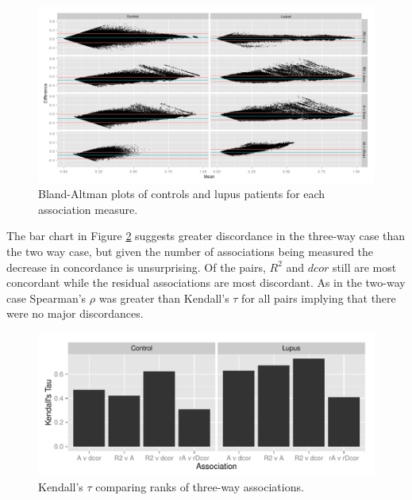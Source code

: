 \documentclass[a4paper, 12pt]{report}
\begin{document}

\begin{figure}[H]
\begin{centering}
\includegraphics[width=\textwidth]{3wayBA.png}
\caption{Bland-Altman plots of controls and lupus patients for each association measure.} 
\label{F:3wayBA}
\end{centering}
\end{figure}

The bar chart in Figure \ref{F:3wayKendall} suggests greater discordance in the three-way case than the two way case, but given the number of associations being measured the decrease in concordance is unsurprising. Of the pairs, $R^2$ and $dcor$ still are most concordant while the residual associations are most discordant. As in the two-way case Spearman's $\rho$ was greater than Kendall's $\tau$ for all pairs implying that there were no major discordances.

\begin{figure}[H]
\begin{centering}
\includegraphics[width=\textwidth]{3wayKendall.pdf}
\caption{Kendall's $\tau$ comparing ranks of three-way associations.} 
\label{F:3wayKendall}
\end{centering}
\end{figure}
\end{document}
